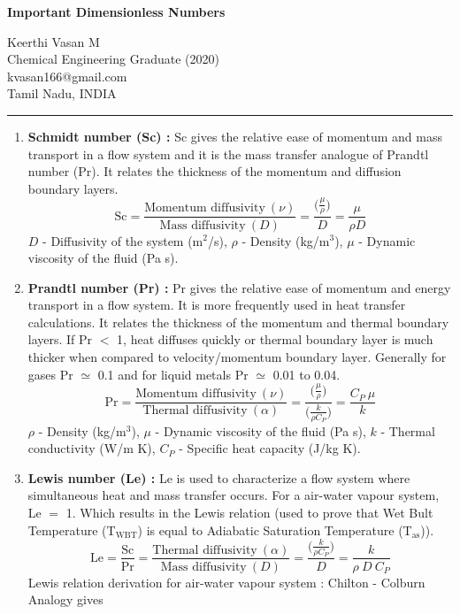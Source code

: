 \documentclass[a4paper, 12 pt]{article}
\begin{document}
\begin{center}
    \large \textbf{Important Dimensionless Numbers}    
\end{center}

\begin{flushright}
    Keerthi Vasan M\\Chemical Engineering Graduate (2020)\\kvasan166@gmail.com\\Tamil Nadu, INDIA
\end{flushright}

\rule{\linewidth}{0.5 pt}

\begin{enumerate}
    \item \textbf{Schmidt number (Sc) :} Sc gives the relative ease of momentum and mass transport in a flow system and it is the mass transfer analogue of Prandtl number (Pr). It relates the thickness of the momentum and diffusion boundary layers. $$\text{Sc}=\frac{\text{Momentum diffusivity}\ (\nu)}{\text{Mass diffusivity}\  (D)}=\frac{\big(\frac{\mu}{\rho}\big)}{D}=\frac{\mu}{\rho D}$$ $D$ - Diffusivity of the system (m$^2$/s), $\rho$ - Density (kg/m$^3$), $\mu$ - Dynamic viscosity of the fluid (Pa s).
    
    \item \textbf{Prandtl number (Pr) :} Pr gives the relative ease of momentum and energy transport in a flow system. It is more frequently used in heat transfer calculations. It relates the thickness of the momentum and thermal boundary layers. If Pr $<$ 1, heat diffuses quickly or thermal boundary layer is much thicker when compared to velocity/momentum boundary layer. Generally for gases Pr $\simeq$ 0.1 and for liquid metals Pr $\simeq$ 0.01 to 0.04. $$\text{Pr}=\frac{\text{Momentum diffusivity}\ (\nu)}{\text{Thermal diffusivity}\  (\alpha)}=\frac{\big(\frac{\mu}{\rho}\big)}{\big(\frac{k}{\rho C_P}\big)}=\frac{C_P\ \mu}{k}$$ $\rho$ - Density (kg/m$^3$), $\mu$ - Dynamic viscosity of the fluid (Pa s), $k$ - Thermal conductivity (W/m K), $C_P$ - Specific heat capacity (J/kg K).
    
    \item \textbf{Lewis number (Le) :} Le is used to characterize a flow system where simultaneous heat and mass transfer occurs. For a air-water vapour system, Le $=$ 1. Which results in the Lewis relation (used to prove that Wet Bult Temperature (T$_{\text{WBT}}$) is equal to Adiabatic Saturation Temperature (T$_{\text{as}}$)). $$\text{Le}=\frac{\text{Sc}}{\text{Pr}}=\frac{\text{Thermal diffusivity}\ (\alpha)}{\text{Mass diffusivity}\  (D)}=\frac{\big(\frac{k}{\rho C_P}\big)}{D}=\frac{k}{\rho \ D\ C_P}$$Lewis relation derivation for air-water vapour system : Chilton - Colburn Analogy gives
    

\end{enumerate}
\end{document}
